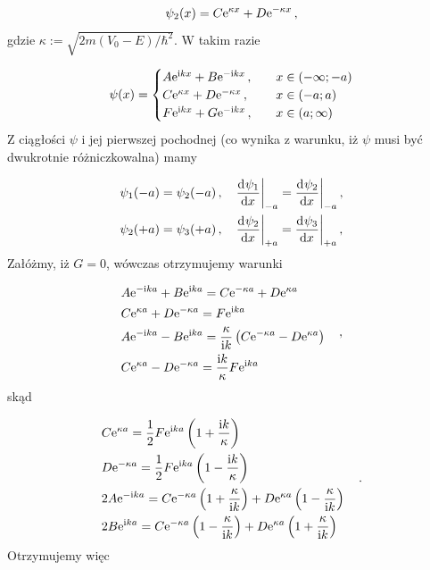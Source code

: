 \documentclass{myclass}
\begin{document}
\begin{equation*}
    \psi_2(x)=C\mathrm{e}^{\kappa x}+D\mathrm{e}^{-\kappa x}\,,
\end{equation*}
gdzie \(\kappa:=\sqrt{2m(V_0-E)/\hbar^2}\). W takim razie

\begin{equation*}
    \psi(x)=\begin{cases}
    A\mathrm{e}^{\mathrm{i} kx}+B\mathrm{e}^{-\mathrm{i} kx}\,,&\quad x\in(-\infty;-a)\\
    C\mathrm{e}^{\kappa x}+D\mathrm{e}^{-\kappa x}\,,&\quad x\in(-a;a)\\
    F\mathrm{e}^{\mathrm{i} kx}+G\mathrm{e}^{-\mathrm{i} kx}\,,&\quad x\in(a;\infty)
    \end{cases}
\end{equation*}
Z ciągłości \(\psi\) i jej pierwszej pochodnej (co wynika z warunku, iż \(\psi\) musi być dwukrotnie
różniczkowalna) mamy

\begin{equation*}
    \begin{split}
        &\psi_1(-a)=\psi_2(-a)\,,\quad \dv[]{\psi_1}{x}\bigg|_{-a}=\dv[]{\psi_2}{x}\bigg|_{-a}\,,\\
        &\psi_2(+a)=\psi_3(+a)\,,\quad \dv[]{\psi_2}{x}\bigg|_{+a}=\dv[]{\psi_3}{x}\bigg|_{+a}\,,
    \end{split}
\end{equation*}
Załóżmy, iż \(G=0\), wówczas otrzymujemy warunki

\begin{equation*}
\begin{split}
    &A\mathrm{e}^{-\mathrm{i} ka}+B\mathrm{e}^{\mathrm{i} ka}=C\mathrm{e}^{-\kappa a}+D\mathrm{e}^{\kappa a}\\
    &C\mathrm{e}^{\kappa a}+D\mathrm{e}^{-\kappa a}=F\mathrm{e}^{\mathrm{i} ka}\\
    &A\mathrm{e}^{-\mathrm{i} ka}-B\mathrm{e}^{\mathrm{i} ka}=\frac{\kappa}{\mathrm{i} k}\left(C\mathrm{e}^{-\kappa a}-D\mathrm{e}^{\kappa a}\right)\\
    &C\mathrm{e}^{\kappa a}-D\mathrm{e}^{-\kappa a}=\frac{\mathrm{i} k}{\kappa }F\mathrm{e}^{\mathrm{i} ka}
\end{split}\quad\,,
\end{equation*}
skąd

\begin{equation*}
\begin{split}
    &C\mathrm{e}^{\kappa a}=\frac{1}{2}F\mathrm{e}^{\mathrm{i} ka}\left(1+\frac{\mathrm{i} k}{\kappa}\right)\\
    &D\mathrm{e}^{-\kappa a}=\frac{1}{2}F\mathrm{e}^{\mathrm{i} ka}\left(1-\frac{\mathrm{i} k}{\kappa}\right)\\
    &2A\mathrm{e}^{-\mathrm{i} ka}=C\mathrm{e}^{-\kappa a}\left(1+\frac{\kappa}{\mathrm{i} k}\right)+D\mathrm{e}^{\kappa a}\left(1-\frac{\kappa}{\mathrm{i} k}\right)\\
    &2B\mathrm{e}^{\mathrm{i} ka}=C\mathrm{e}^{-\kappa a}\left(1-\frac{\kappa}{\mathrm{i} k}\right)+D\mathrm{e}^{\kappa a}\left(1+\frac{\kappa}{\mathrm{i} k}\right)
\end{split}\quad\,.
\end{equation*}
Otrzymujemy więc
\end{document}
